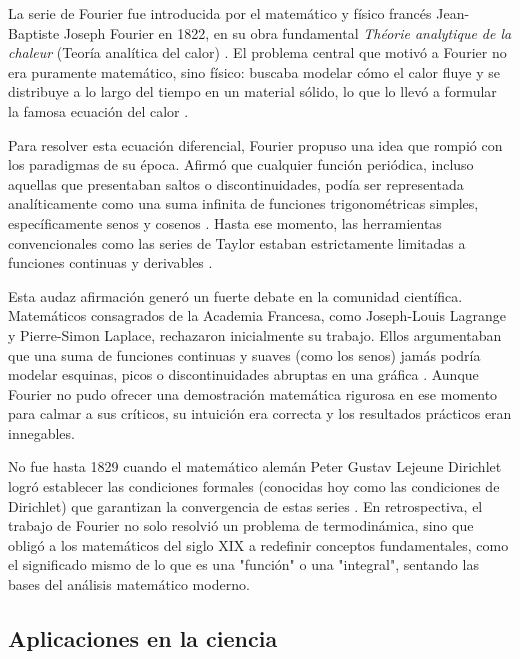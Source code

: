 La serie de Fourier fue introducida por el matemático y físico francés Jean-Baptiste Joseph Fourier en 1822, en su obra fundamental \textit{Théorie analytique de la chaleur} (Teoría analítica del calor) \cite{fourier:teoria-calor:1822}. El problema central que motivó a Fourier no era puramente matemático, sino físico: buscaba modelar cómo el calor fluye y se distribuye a lo largo del tiempo en un material sólido, lo que lo llevó a formular la famosa ecuación del calor \cite{kreyszig:matematicas-avanzadas:2011}.

Para resolver esta ecuación diferencial, Fourier propuso una idea que rompió con los paradigmas de su época. Afirmó que cualquier función periódica, incluso aquellas que presentaban saltos o discontinuidades, podía ser representada analíticamente como una suma infinita de funciones trigonométricas simples, específicamente senos y cosenos \cite{fourier:teoria-calor:1822}. Hasta ese momento, las herramientas convencionales como las series de Taylor estaban estrictamente limitadas a funciones continuas y derivables \cite{oppenheim:senales-sistemas:1997}.

Esta audaz afirmación generó un fuerte debate en la comunidad científica. Matemáticos consagrados de la Academia Francesa, como Joseph-Louis Lagrange y Pierre-Simon Laplace, rechazaron inicialmente su trabajo. Ellos argumentaban que una suma de funciones continuas y suaves (como los senos) jamás podría modelar esquinas, picos o discontinuidades abruptas en una gráfica \cite{kreyszig:matematicas-avanzadas:2011}. Aunque Fourier no pudo ofrecer una demostración matemática rigurosa en ese momento para calmar a sus críticos, su intuición era correcta y los resultados prácticos eran innegables.

No fue hasta 1829 cuando el matemático alemán Peter Gustav Lejeune Dirichlet logró establecer las condiciones formales (conocidas hoy como las condiciones de Dirichlet) que garantizan la convergencia de estas series \cite{oppenheim:senales-sistemas:1997}. En retrospectiva, el trabajo de Fourier no solo resolvió un problema de termodinámica, sino que obligó a los matemáticos del siglo XIX a redefinir conceptos fundamentales, como el significado mismo de lo que es una "función" o una "integral", sentando las bases del análisis matemático moderno.

\subsection{Aplicaciones en la ciencia}
\label{sec:cap01:marco-teorico:ciencia}

